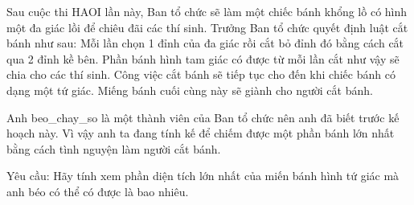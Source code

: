 Sau cuộc thi HAOI lần này, Ban tổ chức sẽ làm một chiếc bánh khổng lồ có hình một đa giác lồi để chiêu đãi các thí sinh. Trưởng Ban tổ chức quyết định luật cắt bánh như sau: Mỗi lần chọn 1 đỉnh của đa giác rồi cắt bỏ đỉnh đó bằng cách cắt qua 2 đỉnh kề bên. Phần bánh hình tam giác có được từ mỗi lần cắt như vậy sẽ chia cho các thí sinh. Công việc cắt bánh sẽ tiếp tục cho đến khi chiếc bánh có dạng một tứ giác. Miếng bánh cuối cùng này sẽ giành cho người cắt bánh.  

   Anh beo\_chay\_so là một thành viên của Ban tổ chức nên anh đã biết trước kế hoạch này. Vì vậy anh ta đang tính kế để chiếm được một phần bánh lớn nhất bằng cách tình nguyện làm người cắt bánh.  

   Yêu cầu: Hãy tính xem phần diện tích lớn nhất của miến bánh hình tứ giác mà anh béo có thể có được là bao nhiêu.